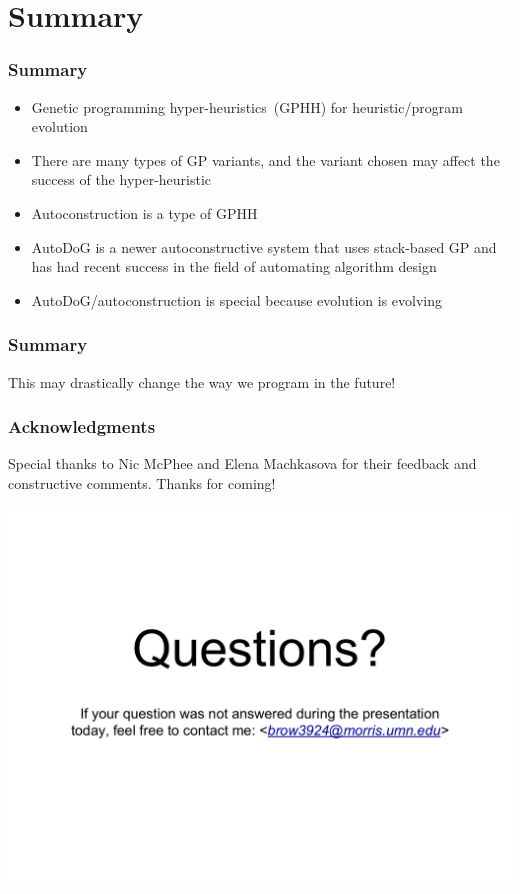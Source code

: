 \documentclass{beamer}
\newcommand{\linespace}{\vskip 0.25cm}
\begin{document}
\section[Summary]{Summary}

\begin{frame}
	\frametitle{Summary}
	\begin{itemize}
		\item Genetic programming hyper-heuristics~(GPHH) for heuristic/program evolution
		\linespace
		\pause
		\item There are many types of GP variants, and the variant chosen may affect the success of the hyper-heuristic
		\linespace
		\pause
		\item Autoconstruction is a type of GPHH
		\linespace
		\pause
		\item AutoDoG is a newer autoconstructive system that uses stack-based GP and has had recent success in the field of automating algorithm design
		\linespace
		\pause
		\item AutoDoG/autoconstruction is special because evolution is evolving
		\linespace
	\end{itemize}
\end{frame}

\begin{frame}
	\frametitle{Summary}
	\centering
	\large This may drastically change the way we program in the future!
\end{frame}

\begin{frame}
	\frametitle{Acknowledgments}
	\centering
	Special thanks to Nic McPhee and Elena Machkasova for their feedback and constructive comments.
	\linespace
	\linespace
	\large Thanks for coming!
\end{frame}

\begin{frame}
	\includegraphics[width=1\textwidth]{Illustrations/questions.PDF}
\end{frame}
\end{document}
